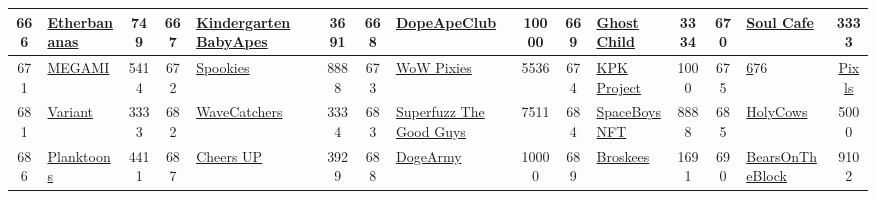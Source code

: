 \begin{table*}[]
{\begin{tabular}{|c|l|c|c|l|c|c|l|c|c|l|c|c|l|c|}
        666   & \href{http://Ether-Bananas.com}{Etherbananas}                                      & 749               & 667   & \href{https://kbabyapes.com}{Kindergarten BabyApes}                                               & 3691              & 668   & \href{https://dopeapedao.com/}{DopeApeClub}                                       & 10000             & 669   & \href{https://ghostchild.xyz/bones}{Ghost Child}                              & 3334              & 670   & \href{https://soulcafe.io/}{Soul Cafe}                                                    & 3333                                    \\ \hline
        671   & \href{https://megami.io/}{MEGAMI}                                                  & 5414              & 672   & \href{http://www.spookies.gallery}{Spookies}                                                      & 8888              & 673   & \href{http://wowpixies.com}{WoW Pixies}                                           & 5536              & 674   & \href{https://kopokostudio.com}{KPK Project}                                  & 1000              & 675   &\href{https://paragraph.xyz/@paper-bag/paper-bag?blogname=} 676                               & \href{https://www.pixltonnft.com}{Pixls} \\ \hline
        681   & \href{https://variantnft.io/}{Variant}                                             & 3333              & 682   & \href{http://wavecatchers.io}{WaveCatchers}                                                       & 3334              & 683   & \href{https://superfuzz.io/}{Superfuzz The Good Guys}                             & 7511              & 684   & \href{https://spaceboysnft.io/}{SpaceBoysNFT}                                 & 8888              & 685   & \href{http://holycows.com}{HolyCows}                                                      & 5000                                    \\ \hline
        686   & \href{http://planktoons.io}{Planktoons}                                            & 4411              & 687   & \href{https://www.cryptonatty.io}{Cheers UP}                                                      & 3929              & 688   & \href{https://www.realshibadoge.com/doge-army-nft}{DogeArmy}                      & 10000             & 689   & \href{https://www.broskees.io/}{Broskees}                                     & 1691              & 690   & \href{https://bullsontheblock.com/}{BearsOnTheBlock}                                      & 9102                                    \\ \hline

\end{tabular}}
\end{table*}
